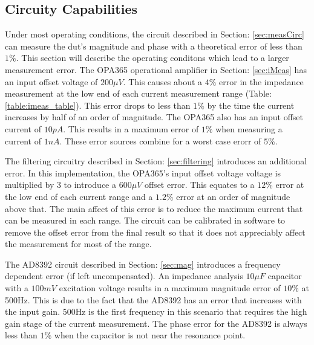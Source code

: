 \subsection{Circuity Capabilities}

Under most operating conditions, the circuit described in Section: \ref{sec:measCirc} can measure the \gls{dut}'s magnitude and phase with a theoretical error of less than $1\%$. This section will describe the operating conditons which lead to a larger measurement error. The OPA365 operational amplifier in Section: \ref{sec:iMeas} has an input offset voltage of $200\mu V$. This causes about a $4\%$ error in the impedance measurement at the low end of each current measurement range (Table: \ref{table:imeas_table}). This error drops to less than $1\%$ by the time the current increases by half of an order of magnitude.  The OPA365 also has an input offset current of $10pA$. This results in a maximum error of $1\%$ when measuring a current of $1nA$. These error sources combine for a worst case erorr of $5\%$.

The filtering circuitry described in Section: \ref{sec:filtering} introduces an additional error. In this implementation, the OPA365's input offset voltage voltage is multiplied by 3 to introduce a $600\mu V$ offset error. This equates to a $12\%$ error at the low end of each current range and a $1.2\%$ error at an order of magnitude above that. The main affect of this error is to reduce the maximum current that can be measured in each range. The circuit can be calibrated in software to remove the offset error from the final result so that it does not appreciably affect the measurement for most of the range.

The AD8392 circuit described in Section: \ref{sec:mag} introduces a frequency dependent error (if left uncompensated). An impedance analysis $10\mu F$ capacitor with a $100mV$ excitation voltage results in a maximum magnitude error of $10\%$ at 500Hz. This is due to the fact that the AD8392 has an error that increases with the input gain. 500Hz is the first frequency in this scenario that requires the high gain stage of the current measurement. The phase error for the AD8392 is always less than $1\%$ when the capacitor is not near the resonance point.

